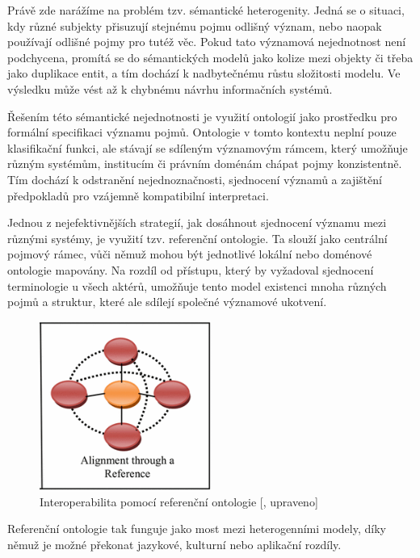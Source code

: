 Právě zde narážíme na problém tzv. sémantické heterogenity. Jedná se o situaci, kdy různé subjekty přisuzují stejnému pojmu odlišný význam, nebo naopak používají odlišné pojmy pro tutéž věc. Pokud tato významová nejednotnost není podchycena, promítá se do sémantických modelů jako kolize mezi objekty či třeba jako duplikace entit, a tím dochází k nadbytečnému růstu složitosti modelu. Ve výsledku může vést až k chybnému návrhu informačních systémů. \cite{Menzel2022}

Řešením této sémantické nejednotnosti je využití ontologií jako prostředku pro formální specifikaci významu pojmů. Ontologie v tomto kontextu neplní pouze klasifikační funkci, ale stávají se sdíleným významovým rámcem, který umožňuje různým systémům, institucím či právním doménám chápat pojmy konzistentně. Tím dochází k odstranění nejednoznačnosti, sjednocení významů a zajištění předpokladů pro vzájemně kompatibilní interpretaci. \cite{Kupcik2012}

Jednou z nejefektivnějších strategií, jak dosáhnout sjednocení významu mezi různými systémy, je využití tzv. referenční ontologie. Ta slouží jako centrální pojmový rámec, vůči němuž mohou být jednotlivé lokální nebo doménové ontologie mapovány. Na rozdíl od přístupu, který by vyžadoval sjednocení terminologie u všech aktérů, umožňuje tento model existenci mnoha různých pojmů a struktur, které ale sdílejí společné významové ukotvení.

\begin{figure}[H]
  \centering
  \includegraphics[width=0.5\textwidth
  ]{images/reference_ontology.png}
  \caption{Interoperabilita pomocí referenční ontologie [\cite{ZemmouchiGhomari2009}, upraveno]}
  \label{fig:reference_ontology}
\end{figure}

Referenční ontologie tak funguje jako most mezi heterogenními modely, díky němuž je možné překonat jazykové, kulturní nebo aplikační rozdíly. \cite{ZemmouchiGhomari2009}

